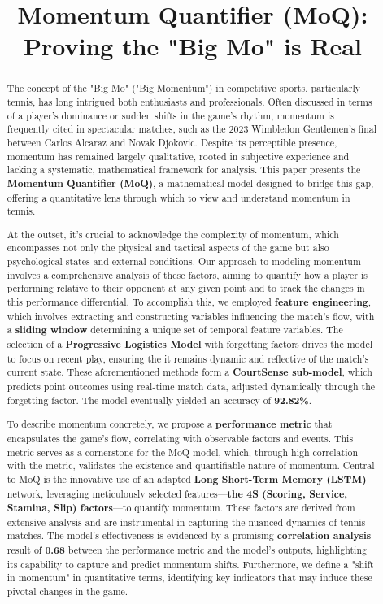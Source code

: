 \documentclass[12pt]{article}  %
\title{Momentum Quantifier (MoQ): Proving the "Big Mo" is Real}  %
\begin{document}
\begin{abstract}
    
The concept of the "Big Mo" ("Big Momentum") in competitive sports, particularly tennis, has long intrigued both enthusiasts and professionals. Often discussed in terms of a player's dominance or sudden shifts in the game's rhythm, momentum is frequently cited in spectacular matches, such as the 2023 Wimbledon Gentlemen’s final between Carlos Alcaraz and Novak Djokovic. Despite its perceptible presence, momentum has remained largely qualitative, rooted in subjective experience and lacking a systematic, mathematical framework for analysis. This paper presents the \textbf{Momentum Quantifier (MoQ)}, a mathematical model designed to bridge this gap, offering a quantitative lens through which to view and understand momentum in tennis.

At the outset, it's crucial to acknowledge the complexity of momentum, which encompasses not only the physical and tactical aspects of the game but also psychological states and external conditions. Our approach to modeling momentum involves a comprehensive analysis of these factors, aiming to quantify how a player is performing relative to their opponent at any given point and to track the changes in this performance differential. To accomplish this, we employed \textbf{feature engineering}, which involves extracting and constructing variables influencing the match's flow, with a \textbf{sliding window} determining a unique set of temporal feature variables. The selection of a \textbf{Progressive Logistics Model} with forgetting factors drives the model to focus on recent play, ensuring the it remains dynamic and reflective of the match's current state. These aforementioned methods form a \textbf{CourtSense sub-model}, which predicts point outcomes using real-time match data, adjusted dynamically through the forgetting factor. The model eventually yielded an accuracy of \textbf{92.82\%}.

To describe momentum concretely, we propose a \textbf{performance metric} that encapsulates the game's flow, correlating with observable factors and events. This metric serves as a cornerstone for the MoQ model, which, through high correlation with the metric, validates the existence and quantifiable nature of momentum. Central to MoQ is the innovative use of an adapted \textbf{Long Short-Term Memory (LSTM)} network, leveraging meticulously selected features—\textbf{the 4S (Scoring, Service, Stamina, Slip) factors}—to quantify momentum. These factors are derived from extensive analysis and are instrumental in capturing the nuanced dynamics of tennis matches. The model's effectiveness is evidenced by a promising \textbf{correlation analysis} result of\textbf{ 0.68 }between the performance metric and the model's outputs, highlighting its capability to capture and predict momentum shifts. Furthermore, we define a "shift in momentum" in quantitative terms, identifying key indicators that may induce these pivotal changes in the game.


\end{abstract}
\end{document}
